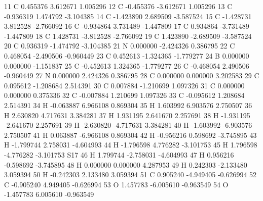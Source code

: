 11 C 0.455376 3.612671 1.005296
12 C -0.455376 -3.612671 1.005296
13 C -0.936319 1.474792 -3.104385
14 C -1.423890 2.689509 -3.587524
15 C -1.428731 3.812528 -2.766092
16 C -0.934864 3.731489 -1.447809
17 C 0.934864 -3.731489 -1.447809
18 C 1.428731 -3.812528 -2.766092
19 C 1.423890 -2.689509 -3.587524
20 C 0.936319 -1.474792 -3.104385
21 N 0.000000 -2.424326 0.386795
22 C 0.468054 -2.490506 -0.960449
23 C 0.452613 -1.324365 -1.779277
24 B 0.000000 0.000000 -1.151837
25 C -0.452613 1.324365 -1.779277
26 C -0.468054 2.490506 -0.960449
27 N 0.000000 2.424326 0.386795
28 C 0.000000 0.000000 3.202583
29 C 0.095612 -1.208684 2.514391
30 C 0.007884 -1.210699 1.097326
31 C 0.000000 0.000000 0.375336
32 C -0.007884 1.210699 1.097326
33 C -0.095612 1.208684 2.514391
34 H -0.063887 6.966108 0.869304
35 H 1.603992 6.903576 2.750507
36 H 2.630820 4.717631 3.384281
37 H 1.931195 2.641670 2.257691
38 H -1.931195 -2.641670 2.257691
39 H -2.630820 -4.717631 3.384281
40 H -1.603992 -6.903576 2.750507
41 H 0.063887 -6.966108 0.869304
42 H -0.956216 0.598692 -3.745895
43 H -1.799744 2.758031 -4.604993
44 H -1.796598 4.776282 -3.101753
45 H 1.796598 -4.776282 -3.101753
S17
46 H 1.799744 -2.758031 -4.604993
47 H 0.956216 -0.598692 -3.745895
48 H 0.000000 0.000000 4.287953
49 H 0.242303 -2.133480 3.059394
50 H -0.242303 2.133480 3.059394
51 C 0.905240 -4.949405 -0.626994
52 C -0.905240 4.949405 -0.626994
53 O 1.457783 -6.005610 -0.963549
54 O -1.457783 6.005610 -0.963549